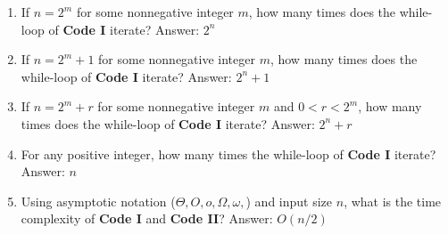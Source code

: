 \documentclass[12pt]{article}
\newenvironment{problem}[2][Problem]{\begin{trivlist}
\item[\hskip \labelsep {\bfseries #1}\hskip \labelsep {\bfseries #2.}]}{\end{trivlist}}
\begin{document}
\begin{enumerate}
\begin{enumerate}
\item If $n = 2^m$ for some nonnegative integer $m$, how many times does the while-loop
of \textbf{Code I} iterate?
\newline
Answer: $2^n$
\item If $n = 2^m + 1$ for some nonnegative integer $m$, how many times does the while-loop 
of \textbf{Code I} iterate?
\newline
Answer: $2^n + 1$
\item If $n = 2^m + r$ for some nonnegative integer $m$ and $0 < r < 2^m$, how many times does 
the while-loop of \textbf{Code I} iterate?
\newline
Answer: $2^n + r$
\item For any positive integer, how many times the while-loop of \textbf{Code I} iterate?
\newline Answer: $n$

\item Using asymptotic notation ($\Theta, O, o, \Omega, \omega,$) and input size $n$, what is the time complexity of \textbf{Code I} and \textbf{Code II}?\newline
Answer: $O(n/2)$
\end{enumerate}

\end{enumerate}



\end{document}
